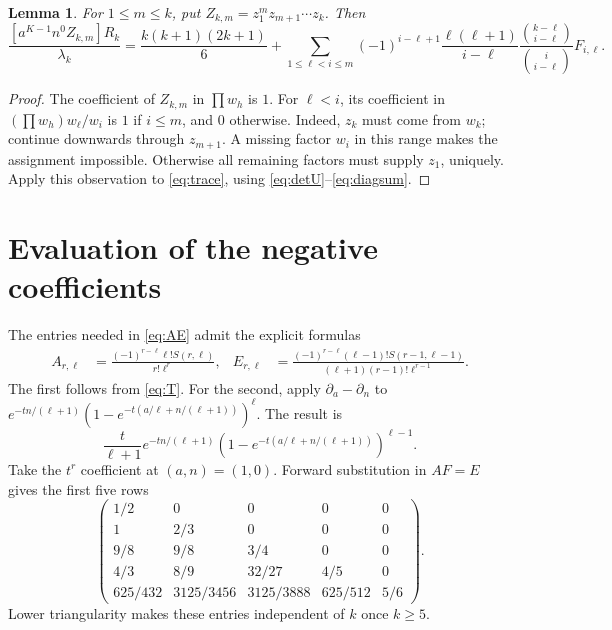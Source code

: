\documentclass[11pt]{article}
\newtheorem{lemma}[theorem]{Lemma}
\newcommand{\coef}[1]{\left[#1\right]}
\begin{document}
\begin{lemma}\label{lem:family}
For $1\leq m\leq k$, put $Z_{k,m}=z_1^m z_{m+1}\cdots z_k$.
Then
\begin{equation}\label{eq:family}
 \frac{\coef{a^{K-1}n^0Z_{k,m}}R_k}{\lambda_k}
 =\frac{k(k+1)(2k+1)}6+
 \sum_{1\leq\ell<i\leq m}
 (-1)^{i-\ell+1}\frac{\ell(\ell+1)}{i-\ell}
 \frac{\binom{k-\ell}{i-\ell}}{\binom{i}{i-\ell}}F_{i,\ell}.
\end{equation}
\end{lemma}
\begin{proof}
The coefficient of $Z_{k,m}$ in $\prod w_h$ is $1$. For $\ell<i$, its
coefficient in $(\prod w_h)w_\ell/w_i$ is $1$ if $i\leq m$, and $0$
otherwise. Indeed, $z_k$ must come from $w_k$; continue downwards through
$z_{m+1}$. A missing factor $w_i$ in this range makes the assignment
impossible. Otherwise all remaining factors must supply $z_1$, uniquely.
Apply this observation to \eqref{eq:trace}, using
\eqref{eq:detU}--\eqref{eq:diagsum}.
\end{proof}

\section{Evaluation of the negative coefficients}

The entries needed in \eqref{eq:AE} admit the explicit formulas
\begin{align}
 A_{r,\ell}&=\frac{(-1)^{r-\ell}\ell!S(r,\ell)}{r!\ell^r},&
 E_{r,\ell}&=\frac{(-1)^{r-\ell}(\ell-1)!S(r-1,\ell-1)}
 {(\ell+1)(r-1)!\ell^{r-1}}.\label{eq:stirlingAE}
\end{align}
The first follows from \eqref{eq:T}. For the second, apply
$\partial_a-\partial_n$ to
$e^{-tn/(\ell+1)}(1-e^{-t(a/\ell+n/(\ell+1))})^\ell$.
The result is
\[
 \frac{t}{\ell+1}e^{-tn/(\ell+1)}
 (1-e^{-t(a/\ell+n/(\ell+1))})^{\ell-1}.
\]
Take the $t^r$ coefficient at $(a,n)=(1,0)$.
Forward substitution in $AF=E$ gives the first five rows
\begin{equation}\label{eq:Ftable}
 \begin{pmatrix}
 1/2&0&0&0&0\\
 1&2/3&0&0&0\\
 9/8&9/8&3/4&0&0\\
 4/3&8/9&32/27&4/5&0\\
 625/432&3125/3456&3125/3888&625/512&5/6
 \end{pmatrix}.
\end{equation}
Lower triangularity makes these entries independent of $k$ once $k\geq5$.
\end{document}
